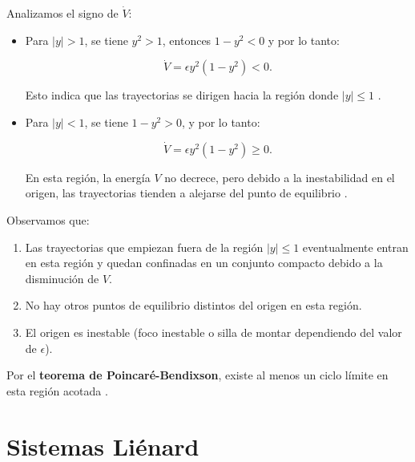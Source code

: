 Analizamos el signo de \(\dot{V}\):

\begin{itemize}
    \item Para \( |y| > 1 \), se tiene \( y^2 > 1 \), entonces \( 1 - y^2 < 0 \) y por lo tanto:

    \begin{equation}
        \dot{V} = \epsilon y^2 (1 - y^2) < 0.
    \end{equation}

    Esto indica que las trayectorias se dirigen hacia la región donde \( |y| \leq 1 \) \cite{hahn1967stability}.

    \item Para \( |y| < 1 \), se tiene \( 1 - y^2 > 0 \), y por lo tanto:

    \begin{equation}
        \dot{V} = \epsilon y^2 (1 - y^2) \geq 0.
    \end{equation}

    En esta región, la energía \( V \) no decrece, pero debido a la inestabilidad en el origen, las trayectorias tienden a alejarse del punto de equilibrio \cite{lasalle1961stability}.
\end{itemize}

Observamos que:

\begin{enumerate}
    \item Las trayectorias que empiezan fuera de la región \( |y| \leq 1 \) eventualmente entran en esta región y quedan confinadas en un conjunto compacto debido a la disminución de \( V \).

    \item No hay otros puntos de equilibrio distintos del origen en esta región.

    \item El origen es inestable (foco inestable o silla de montar dependiendo del valor de \(\epsilon\)).
\end{enumerate}

Por el \textbf{teorema de Poincaré-Bendixson}, existe al menos un ciclo límite en esta región acotada \cite{guckenheimer1983nonlinear}.
\section{Sistemas Liénard}

